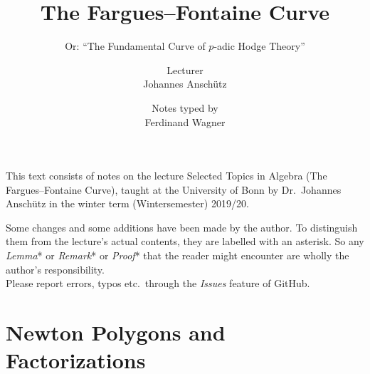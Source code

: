 \documentclass[a4paper, 10pt, oneside, DIV=9, chapterprefix=true, numbers=enddot,bibliography=totoc]{scrbook}
\title{The Fargues--Fontaine Curve}
\subtitle{Or: \enquote{The Fundamental Curve of $p$-adic Hodge Theory}}
\author{{\normalsize Lecturer}\\
	Johannes Anschütz}
\date{{\normalsize Notes typed by}\\
	Ferdinand Wagner}
\begin{document}
\frontmatter
{}
\maketitle
\noindent This text consists of notes on the lecture Selected Topics in Algebra (The Fargues--Fontaine Curve), taught at the University of
Bonn by Dr.\ Johannes Anschütz in the winter term (Wintersemester) 2019/20.

Some changes and some additions have been made by the author. To distinguish them from the lecture's actual contents, they are labelled with an asterisk. So any \emph{Lemma}* or \emph{Remark}* or \emph{Proof}* that the reader might encounter are wholly the author's responsibility.\\[\thmsep]Please report errors, typos etc.\ through the \emph{Issues} feature of GitHub.


\tableofcontents
{}
\setcounter{llecture}{-1}


\mainmatter{}
\renewcommand{\thedummy}{\thesection.\arabic{dummy}}




\section{Newton Polygons and Factorizations}
\end{document}
